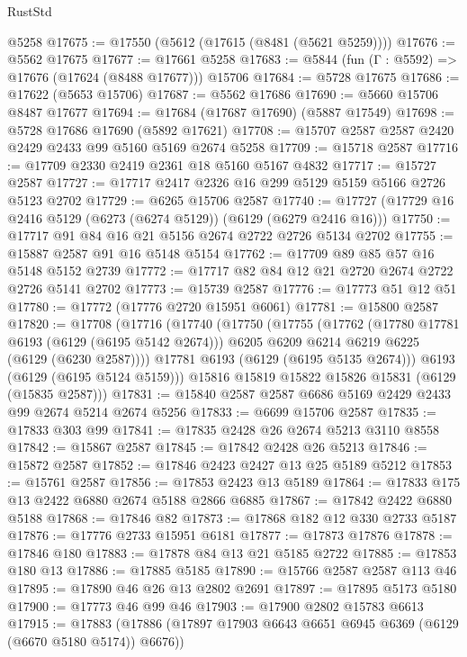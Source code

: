 \begin{lexlean}{RustStd}
\begin{coremodule}
    @5258
@17675 := @17550 (@5612 (@17615 (@8481 (@5621 @5259))))
@17676 := @5562 @17675
@17677 := @17661 @5258
@17683 := @5844 (fun (Γ : @5592) => @17676 (@17624 (@8488 @17677))) @15706
@17684 := @5728 @17675
@17686 := @17622 (@5653 @15706)
@17687 := @5562 @17686
@17690 := @5660 @15706 @8487 @17677
@17694 := @17684 (@17687 @17690) (@5887 @17549)
@17698 := @5728 @17686 @17690 (@5892 @17621)
@17708 := @15707 @2587 @2587 @2420 @2429 @2433 @99 @5160 @5169 @2674 @5258
@17709 := @15718 @2587
@17716 := @17709 @2330 @2419 @2361 @18 @5160 @5167 @4832
@17717 := @15727 @2587
@17727 := @17717 @2417 @2326 @16 @299 @5129 @5159 @5166 @2726 @5123 @2702
@17729 := @6265 @15706 @2587
@17740 := @17727 (@17729 @16 @2416 @5129 (@6273 (@6274 @5129)) (@6129 (@6279 @2416 @16)))
@17750 := @17717 @91 @84 @16 @21 @5156 @2674 @2722 @2726 @5134 @2702
@17755 := @15887 @2587 @91 @16 @5148 @5154
@17762 := @17709 @89 @85 @57 @16 @5148 @5152 @2739
@17772 := @17717 @82 @84 @12 @21 @2720 @2674 @2722 @2726 @5141 @2702
@17773 := @15739 @2587
@17776 := @17773 @51 @12 @51
@17780 := @17772 (@17776 @2720 @15951 @6061)
@17781 := @15800 @2587
@17820 := @17708
    (@17716
      (@17740
        (@17750
          (@17755
            (@17762
              (@17780 @17781 @6193 (@6129 (@6195 @5142 @2674)))
              @6205
              @6209
              @6214
              @6219
              @6225
              (@6129 (@6230 @2587))))
          @17781
          @6193
          (@6129 (@6195 @5135 @2674)))
        @6193
        (@6129 (@6195 @5124 @5159)))
      @15816
      @15819
      @15822
      @15826
      @15831
      (@6129 (@15835 @2587)))
@17831 := @15840 @2587 @2587 @6686 @5169 @2429 @2433 @99 @2674 @5214 @2674 @5256
@17833 := @6699 @15706 @2587
@17835 := @17833 @303 @99
@17841 := @17835 @2428 @26 @2674 @5213 @3110 @8558
@17842 := @15867 @2587
@17845 := @17842 @2428 @26 @5213
@17846 := @15872 @2587
@17852 := @17846 @2423 @2427 @13 @25 @5189 @5212
@17853 := @15761 @2587
@17856 := @17853 @2423 @13 @5189
@17864 := @17833 @175 @13 @2422 @6880 @2674 @5188 @2866 @6885
@17867 := @17842 @2422 @6880 @5188
@17868 := @17846 @82
@17873 := @17868 @182 @12 @330 @2733 @5187
@17876 := @17776 @2733 @15951 @6181
@17877 := @17873 @17876
@17878 := @17846 @180
@17883 := @17878 @84 @13 @21 @5185 @2722
@17885 := @17853 @180 @13
@17886 := @17885 @5185
@17890 := @15766 @2587 @2587 @113 @46
@17895 := @17890 @46 @26 @13 @2802 @2691
@17897 := @17895 @5173 @5180
@17900 := @17773 @46 @99 @46
@17903 := @17900 @2802 @15783 @6613
@17915 := @17883 (@17886 (@17897 @17903 @6643 @6651 @6945 @6369 (@6129 (@6670 @5180 @5174)) @6676))

\end{coremodule}
\end{lexlean}
